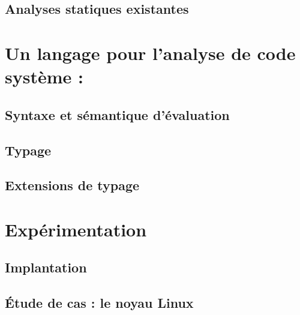 \documentclass[a4paper,11pt]{memoir}
\begin{document}
%

\chapter{Analyses statiques existantes}

\label{cha:etatdelart}





\part{Un langage pour l'analyse de code système : \langname}
\label{part:lang}


\chapter{Syntaxe et sémantique d'évaluation}

\label{cha:lang}


\chapter{Typage}

\label{cha:typbase}


\chapter{Extensions de typage}

\label{cha:qualifs}


\label{cha:ccl2}



\part{Expérimentation}
\label{part:xp}

\chapter{Implantation}

\label{cha:implem}


\chapter{Étude de cas : le noyau Linux}
\end{document}
